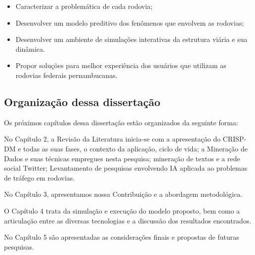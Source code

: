 \begin{itemize}
 \item Caracterizar a problemática de cada rodovia; 
 \item Desenvolver um modelo preditivo dos fenômenos que envolvem as rodovias;
 \item Desenvolver um ambiente de simulações interativas da estrutura viária e sua dinâmica.
 \item Propor soluções para melhor experiência dos usuários que utilizam as rodovias federais pernambucanas.
\end{itemize}


\subsection{ Organização dessa dissertação}\label{intro:sequencia}


Os próximos capítulos dessa dissertação estão organizados da seguinte forma:
\vspace{2mm}

No Capítulo 2, a Revisão da Literatura inicia-se com a apresentação do CRISP-DM  e todas as suas fases, o contexto da aplicação, ciclo de vida; a Mineração de Dados e suas técnicas empregues nesta pesquisa; mineração de textos e a rede social Twitter; Levantamento de pesquisas envolvendo IA aplicada ao problemas de tráfego em rodovias.  

No Capítulo 3, apresentamos nossa Contribuição e a abordagem metodológica.

O Capítulo 4 trata da simulação e execução do modelo proposto, bem como a articulação entre as diversas tecnologias e a discussão dos resultados encontrados.

No Capítulo 5 são apresentadas as considerações finais e propostas de futuras pesquisas.









